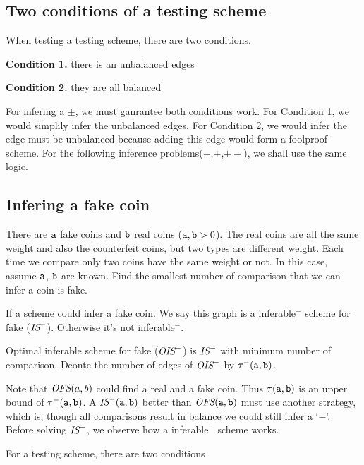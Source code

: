 \subsection*{Two conditions of a testing scheme}

When testing a testing scheme, there are two conditions.

\textbf{Condition 1.} there is an unbalanced edges

\textbf{Condition 2.} they are all balanced

For infering a $\pm$, we must ganrantee both conditions work. For Condition 1, we would simplily infer the unbalanced edges. For Condition 2, we would infer the edge must be unbalanced because adding this edge would form a foolproof scheme.
For the following inference problems($-$,$+$,$+-$), we shall use the same logic. 

\subsection*{Infering a fake coin}
{
\setlength{\leftskip}{1cm}
\setlength{\rightskip}{1cm}
\noindent 
There are $\mathtt{a}$ fake coins and $\mathtt{b}$ real coins ($\mathtt{a}, \mathtt{b} > 0$). The real coins are all the same weight and also the counterfeit coins, but two  types are different weight. Each time we compare only two coins have the same weight or not. In this case, assume $\mathtt{a}$, $\mathtt{b}$ are known.
Find the smallest number of comparison that we can infer a coin is fake.\\

}

\begin{definition}
If a scheme could infer a fake coin. We say this graph is a inferable$^-$ scheme for fake ($\text{\it IS}^-$). Otherwise it's not inferable$^-$.

Optimal inferable scheme for fake ($\text{\it OIS}^-$) is $\text{\it IS}^-$ with minimum number of comparison.
Deonte the number of edges of $\text{\it OIS}^-$ by $\tau^-(\mathtt{a},\mathtt{b})$.
\end{definition}

Note that $\text{\it OFS}(a,b)$ could find a real and a fake coin. Thus $\tau(\mathtt{a},\mathtt{b})$ is an upper bound of $\tau^-(\mathtt{a},\mathtt{b})$.
A $\text{\it IS}^-(\mathtt{a},\mathtt{b})$ better than $\text{\it OFS}(\mathtt{a},\mathtt{b})$ must use another strategy, which is, though all comparisons result in balance we could still infer a `$-$'.\\

Before solving $\text{\it IS}^-$, we observe how a inferable$^-$ scheme works.

For a testing scheme, there are two conditions

